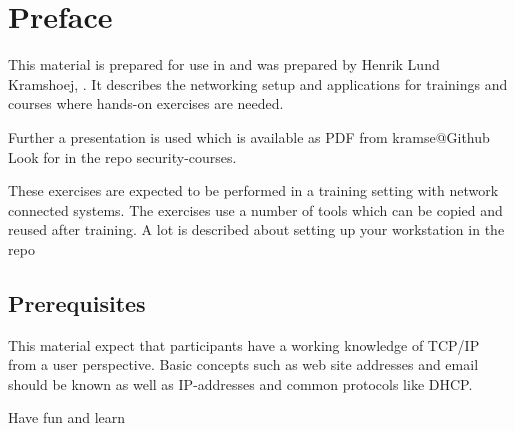 \documentclass[a4paper,11pt,notitlepage]{report}
\begin{document}
\rm
{}

\newcommand{\emne}[1]{Software Security course}
\newcommand{\kursus}[1]{Software Security course}
\newcommand{\kursusnavn}[1]{Software Security course\\ exercises}




\setcounter{tocdepth}{0}

\normal

{\color{titlecolor}\tableofcontents}

\normal
\pagestyle{fancyplain}
\chapter*{\color{titlecolor}Preface}

This material is prepared for use in \emph{\kursus} and was prepared by
Henrik Lund Kramshoej,  .
It describes the networking setup and
applications for trainings and courses where hands-on exercises are needed.

Further a presentation is used which is available as PDF from kramse@Github\\
Look for \jobname in the repo security-courses.

These exercises are expected to be performed in a training setting with network connected systems. The exercises use a number of tools which can be copied and reused after training. A lot is described about setting up your workstation in the repo



\section*{\color{titlecolor}Prerequisites}

This material expect that participants have a working knowledge of
TCP/IP from a user perspective. Basic concepts such as web site addresses and email should be known as well as IP-addresses and common protocols like DHCP.

\vskip 1cm
Have fun and learn
\eject

\rhead{\fancyplain{}{\bf \chaptername\ \thechapter}}
\end{document}
